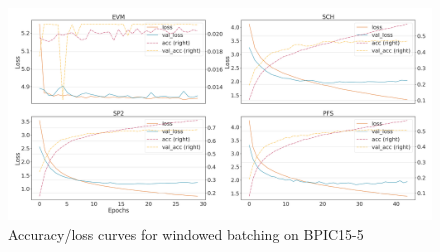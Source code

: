 \begin{figure}[!htb]
    \centering
    \includegraphics[width=\textwidth]{gfx/bpic2015_5/windowed_loss_acc_curve.png}
    \caption{Accuracy/loss curves for windowed batching on BPIC15-5}
\end{figure}
\FloatBarrier
